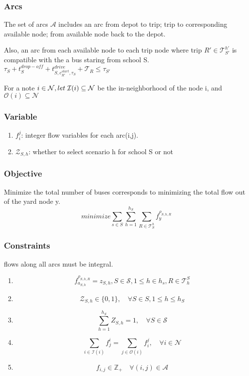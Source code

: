 \documentclass[11pt]{article}
\begin{document}
\subsubsection{Arcs}
\label{sec:orgf991e20}
The set of arcs \textbf{\textbf{\(\mathcal{A}\)}}  includes an arc from depot to trip; trip to corresponding
available node; from available node back to the depot.

Also, an arc from each available node to each trip node where trip \(R' \in
  \mathcal{T}_{S'}^{h'}\) is compatible with the a bus staring from school S.
\(\tau_S + t_S^{drop-off} + t_{S, c_{R'}^{start}, \tau_S}^{drive} + \mathcal{T}_R \le \tau_{S'}\)

For a note \(i \in \mathcal{N}, let \hspace{0.1cm} \mathcal{I}{(i)} \subseteq \mathcal{N}\) be the
in-neighborhood of the node i, and \(\mathcal{O}{(i)} \subseteq \mathcal{N}\)
\subsubsection{Variable}
\label{sec:orgaf8363d}
\begin{enumerate}
\item \(f_i^j\): integer flow variables for each arc(i,j).
\item \(\mathcal{Z}_{S,h}\): whether to select scenario h for school S or not
\end{enumerate}

\subsubsection{Objective}
\label{sec:org34a4d45}
Minimize the total number of buses corresponds to minimizing the total flow
out of the yard node y.
$$ minimize \sum_{s \in S}\sum_{h=1}^{h_S}\sum_{R \in \mathcal{T}_S^h}f_y^{\rho_{S,h,R}}$$ 

\subsubsection{Constraints}
\label{sec:orgff48691}
flows along all arcs must be integral.
\begin{enumerate}
\item $$f_{a_{S,h}}^{\rho_{S,h,R}}= z_{S,h},  S \in \mathcal{S}, 1\leq h \in h_s, R \in \mathcal{T}_h^S$$
\item $$\mathcal{Z}_{S,h} \in \{0,1\}, \quad \forall S \in S, 1 \le h \le h_S$$
\item $$\sum_{h=1}^{h_S}Z_{S,h} = 1, \quad \forall S \in \mathcal{S}$$
\item $$\sum_{i \in \mathcal{I}{(i)}}f_j^i  = \sum_{j \in \mathcal{O}{(i)}}f_i^j,
         \quad \forall i \in \mathcal{N}$$
\item $$f_{i,j} \in \mathbb{Z}_+ \quad  \forall (i,j) \in \mathcal{A} $$
\end{enumerate}
\end{document}
